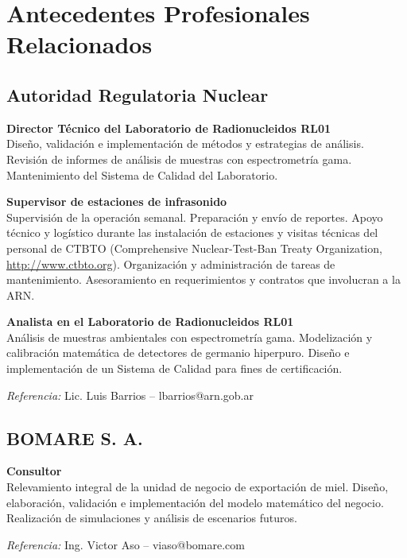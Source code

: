 \section{Antecedentes Profesionales Relacionados}

\subsection{Autoridad Regulatoria Nuclear}

\begin{timeline}
 \textbf{Director Técnico del Laboratorio de Radionucleidos RL01} \\
Diseño, validación e implementación de métodos y estrategias de análisis. Revisión de informes de análisis de muestras con espectrometría gama. Mantenimiento del Sistema de Calidad del Laboratorio.

 \textbf{Supervisor de estaciones de infrasonido} \\
Supervisión de la operación semanal. Preparación y envío de reportes. Apoyo técnico y logístico durante las instalación de estaciones y visitas técnicas del personal de CTBTO (Comprehensive Nuclear-Test-Ban Treaty Organization, \href{http://www.ctbto.org}{http://www.ctbto.org}). Organización y administración de tareas de mantenimiento. Asesoramiento en requerimientos y contratos que involucran a la ARN.

 \textbf{Analista en el Laboratorio de Radionucleidos RL01} \\
Análisis de muestras ambientales con espectrometría gama. Modelización y calibración matemática de detectores de germanio hiperpuro. Diseño e implementación de un Sistema de Calidad para fines de certificación.

\textit{Referencia:} Lic. Luis Barrios -- lbarrios@arn.gob.ar
\end{timeline}

\subsection{BOMARE S. A.}
\begin{timeline}
 \textbf{Consultor} \\
Relevamiento integral de la unidad de negocio de exportación de miel. Diseño, elaboración, validación e implementación del modelo matemático del negocio. Realización de simulaciones y análisis de escenarios futuros.

\textit{Referencia:} Ing. Victor Aso -- viaso@bomare.com
\end{timeline}

